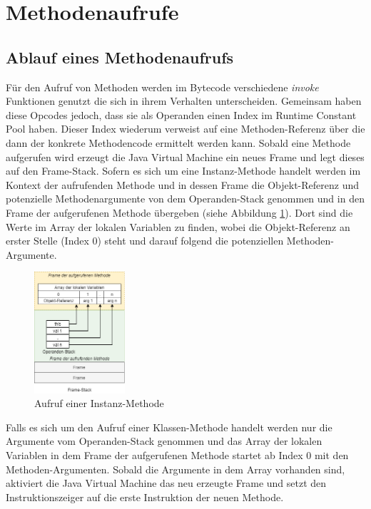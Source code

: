 \documentclass[conference]{IEEEtran}
\begin{document}
\section{Methodenaufrufe}
\subsection{Ablauf eines Methodenaufrufs}
Für den Aufruf von Methoden werden im Bytecode verschiedene \textit{invoke} Funktionen genutzt die sich in ihrem Verhalten unterscheiden. Gemeinsam haben diese Opcodes jedoch, dass sie als Operanden einen Index  im Runtime Constant Pool haben. Dieser Index wiederum verweist auf eine Methoden-Referenz über die dann der konkrete Methodencode ermittelt werden kann. Sobald eine Methode aufgerufen wird erzeugt die Java Virtual Machine ein neues Frame und legt dieses auf den Frame-Stack. Sofern es sich um eine Instanz-Methode handelt werden im Kontext der aufrufenden Methode und in dessen Frame die Objekt-Referenz und potenzielle Methodenargumente von dem Operanden-Stack genommen und in den Frame der aufgerufenen Methode übergeben (siehe Abbildung \ref{fig:aufrufMethode}). Dort sind die Werte im Array der lokalen Variablen zu finden, wobei die Objekt-Referenz an erster Stelle (Index 0) steht und darauf folgend die potenziellen Methoden-Argumente. 

\begin{figure}[htbp] 
  \centering
     \includegraphics[width=0.3\textwidth]{Grafiken/MethodenAufrufJVM.png}
  \caption{Aufruf einer Instanz-Methode}
  \label{fig:aufrufMethode}
\end{figure}

Falls es sich um den Aufruf einer Klassen-Methode handelt werden nur die Argumente vom Operanden-Stack genommen und das Array der lokalen Variablen in dem Frame der aufgerufenen Methode startet ab Index 0 mit den Methoden-Argumenten. Sobald die Argumente in dem Array vorhanden sind, aktiviert die Java Virtual Machine das neu erzeugte Frame und setzt den Instruktionszeiger auf die erste Instruktion der neuen Methode.\cite{Venners.1997}
\end{document}
